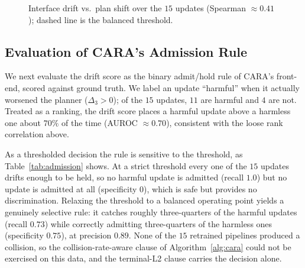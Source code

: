 \documentclass[conference]{IEEEtran}
\begin{document}
\begin{figure}[htbp]
\centering
{}
\caption{Interface drift vs.\ plan shift over the $15$ updates
(Spearman $\approx 0.41$); dashed line is the balanced threshold.}
\label{fig:drift-scatter}
\end{figure}

\subsection{Evaluation of CARA's Admission Rule}
\label{sec:res-admission}
We next evaluate the drift score as the binary admit/hold rule of CARA's
front-end, scored against ground truth. We label an update ``harmful'' when it
actually worsened the planner ($\Delta_3 > 0$); of the $15$ updates, $11$ are
harmful and $4$ are not. Treated as a ranking, the drift score places a harmful
update above a harmless one about $70\%$ of the time (AUROC $\approx 0.70$),
consistent with the loose rank correlation above.

As a thresholded decision the rule is sensitive to the threshold, as
Table~\ref{tab:admission} shows. At a strict threshold every one of the $15$
updates drifts enough to be held, so no harmful update is admitted (recall $1.0$)
but no update is admitted at all (specificity $0$), which is safe but provides no
discrimination. Relaxing the threshold to a balanced operating point yields a
genuinely selective rule: it catches roughly three-quarters of the harmful
updates (recall $0.73$) while correctly admitting three-quarters of the harmless
ones (specificity $0.75$), at precision $0.89$. None of the $15$ retrained
pipelines produced a collision, so the collision-rate-aware clause of
Algorithm~\ref{alg:cara} could not be exercised on this data, and the terminal-L2
clause carries the decision alone.
\end{document}
